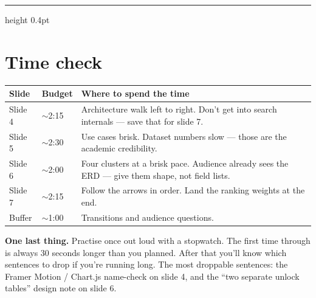 \documentclass[11pt,a4paper]{article}
\begin{document}
\hrule height 0.4pt
\vspace{0.8em}

\section*{Time check}

\begin{tabularx}{\linewidth}{l l X}
\toprule
\textbf{Slide} & \textbf{Budget} & \textbf{Where to spend the time} \\
\midrule
Slide 4 & $\sim$2:15 & Architecture walk left to right. Don't get into search internals --- save that for slide 7. \\
Slide 5 & $\sim$2:30 & Use cases brisk. Dataset numbers slow --- those are the academic credibility. \\
Slide 6 & $\sim$2:00 & Four clusters at a brisk pace. Audience already sees the ERD --- give them shape, not field lists. \\
Slide 7 & $\sim$2:15 & Follow the arrows in order. Land the ranking weights at the end. \\
Buffer  & $\sim$1:00 & Transitions and audience questions. \\
\bottomrule
\end{tabularx}

\vspace{0.8em}

\begin{stagebox}
\textbf{One last thing.} Practise once out loud with a stopwatch. The first time through is always 30 seconds longer than you planned. After that you'll know which sentences to drop if you're running long. The most droppable sentences: the Framer Motion / Chart.js name-check on slide 4, and the ``two separate unlock tables'' design note on slide 6.
\end{stagebox}
\end{document}
